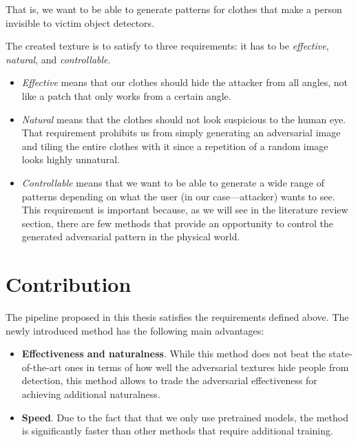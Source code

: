That is, we want to be able to generate patterns for clothes that make a person invisible to victim object detectors.

The created texture is to satisfy to three requirements: it has to be \textit{effective}, \textit{natural}, and \textit{controllable}.


\begin{itemize}
    \item \textit{Effective} means that our clothes should hide the attacker from all angles, not like a patch that only works from a certain angle.

    \item \textit{Natural} means that the clothes should not look suspicious to the human eye. 
    That requirement prohibits us from simply generating an adversarial image and tiling the entire clothes with it since a repetition of a random image looks highly unnatural.

    \item \textit{Controllable} means that we want to be able to generate a wide range of patterns depending on what the user (in our case---attacker) wants to see.
    This requirement is important because, as we will see in the literature review section, there are few methods that provide an opportunity to control the generated adversarial pattern in the physical world.
\end{itemize}

\section{Contribution}

The pipeline proposed in this thesis satisfies the requirements defined above.
The newly introduced method has the following main advantages:

\begin{itemize}
    \item \textbf{Effectiveness and naturalness}.
    While this method does not beat the state-of-the-art ones in terms of how well the adversarial textures hide people from detection, this method allows to trade the adversarial effectiveness for achieving additional naturalness.
    \item \textbf{Speed}.
    Due to the fact that that we only use pretrained models, the method is significantly faster than other methods that require additional training.
\end{itemize}




